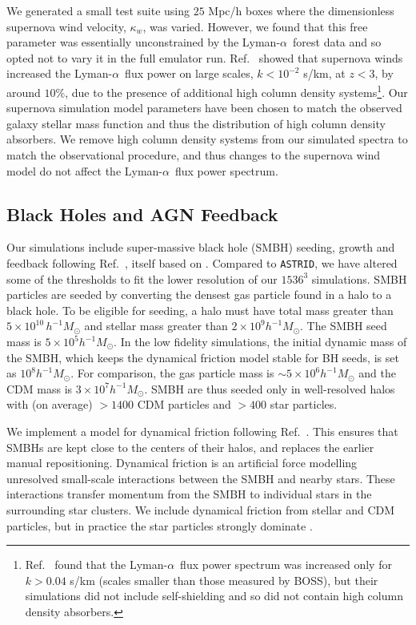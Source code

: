 \documentclass[a4paper,11pt]{article}
\newcommand{\Lya}{Lyman-$\alpha$}
\newcommand{\astrid}{\texttt{ASTRID}}
\begin{document}
We generated a small test suite using $25$ Mpc/h boxes where the dimensionless supernova wind velocity, $\kappa_w$, was varied. However, we found that this free parameter was essentially unconstrained by the \Lya~forest data and so opted not to vary it in the full emulator run. Ref.~\cite{Bolton:2017} showed that supernova winds increased the \Lya~flux power on large scales, $k < 10^{-2}$ s/km, at $z < 3$, by around $10\%$, due to the presence of additional high column density systems\footnote{Ref.~\cite{Viel:2013} found that the \Lya~flux power spectrum was increased only for $ k > 0.04$ s/km (scales smaller than those measured by BOSS), but their simulations did not include self-shielding and so did not contain high column density absorbers.}. Our supernova simulation model parameters have been chosen to match the observed galaxy stellar mass function and thus the distribution of high column density absorbers. We remove high column density systems from our simulated spectra to match the observational procedure, and thus changes to the supernova wind model do not affect the \Lya~flux power spectrum.

\subsection{Black Holes and AGN Feedback}
\label{sec:agn}

Our simulations include super-massive black hole (SMBH) seeding, growth and feedback following Ref.~\cite{Ni:2022}, itself based on \cite{Feng:2016,SDH2005,DSH2005}. Compared to \astrid, we have altered some of the thresholds to fit the lower resolution of our $1536^3$ simulations. SMBH particles are seeded by converting the densest gas particle found in a halo to a black hole. To be eligible for seeding, a halo must have total mass greater than $5\times 10^{10}\,h^{-1}M_\odot$ and stellar mass greater than $2 \times 10^9 h^{-1} M_\odot$. The SMBH seed mass is $5 \times 10^{5} h^{-1} M_\odot$. In the low fidelity simulations, the initial dynamic mass of the SMBH, which keeps the dynamical friction model stable for BH seeds, is set as $10^{8} h^{-1} M_\odot$. For comparison, the gas particle mass is $\sim 5 \times 10^6 h^{-1} M_\odot$ and the CDM mass is $ 3 \times 10^7 h^{-1} M_\odot$. SMBH are thus seeded only in well-resolved halos with (on average) $> 1400$ CDM particles and $>400$ star particles.

We implement a model for dynamical friction following Ref.~\citep{Chen:2021}. This ensures that SMBHs are kept close to the centers of their halos, and replaces the earlier manual repositioning. Dynamical friction is an artificial force modelling unresolved small-scale interactions between the SMBH and nearby stars. These interactions transfer momentum from the SMBH to individual stars in the surrounding star clusters. We include dynamical friction from stellar and CDM particles, but in practice the star particles strongly dominate \cite{Chen:2021}.
\end{document}
